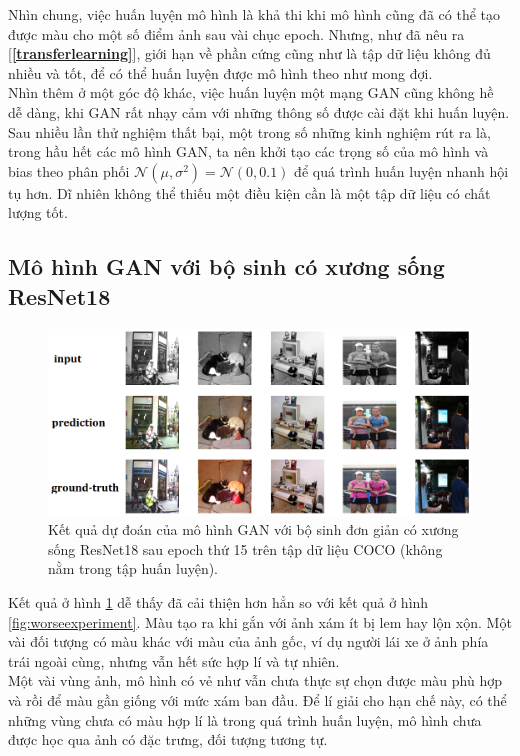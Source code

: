 \documentclass[a4paper, 12pt]{article}
\begin{document}
\noindent
Nhìn chung, việc huấn luyện mô hình là khả thi khi mô hình cũng đã có thể tạo được màu cho một số điểm ảnh sau vài chục epoch. Nhưng, như đã nêu ra [\textbf{\ref{transferlearning}}], giới hạn về phần cứng cũng như là tập dữ liệu không đủ nhiều và tốt, để có thể huấn luyện được mô hình theo như mong đợi.\vspace{5pt}\\
Nhìn thêm ở một góc độ khác, việc huấn luyện một mạng GAN cũng không hề dễ dàng, khi GAN rất nhạy cảm với những thông số được cài đặt khi huấn luyện. Sau nhiều lần thử nghiệm thất bại, một trong số những kinh nghiệm rút ra là, trong hầu hết các mô hình GAN, ta nên khởi tạo các trọng số của mô hình và bias theo phân phối $\mathcal{N}\left(\mu, \sigma^2\right) = \mathcal{N}\left(0, 0.1\right)$ để quá trình huấn luyện nhanh hội tụ hơn. Dĩ nhiên không thể thiếu một điều kiện cần là một tập dữ liệu có chất lượng tốt.

\subsection{Mô hình GAN với bộ sinh có xương sống ResNet18}
\begin{figure}[!h]
\captionsetup{width=0.8\textwidth}
\centering
\includegraphics[width=15cm]{images/4_1.png}
\caption{Kết quả dự đoán của mô hình GAN với bộ sinh đơn giản có xương sống ResNet18 sau epoch thứ 15 trên tập dữ liệu COCO (không nằm trong tập huấn luyện).}
\label{fig:betterexperiment}
\end{figure}

\noindent
Kết quả ở hình \ref{fig:betterexperiment} dễ thấy đã cải thiện hơn hẳn so với kết quả ở hình \ref{fig:worseexperiment}. Màu tạo ra khi gắn với ảnh xám ít bị lem hay lộn xộn. Một vài đối tượng có màu khác với màu của ảnh gốc, ví dụ người lái xe ở ảnh phía trái ngoài cùng, nhưng vẫn hết sức hợp lí và tự nhiên.\vspace{5pt}\\
Một vài vùng ảnh, mô hình có vẻ như vẫn chưa thực sự chọn được màu phù hợp và rồi để màu gần giống với mức xám ban đầu. Để lí giải cho hạn chế này, có thể những vùng chưa có màu hợp lí là trong quá trình huấn luyện, mô hình chưa được học qua ảnh có đặc trưng, đối tượng tương tự.\vspace{5pt}
\end{document}
